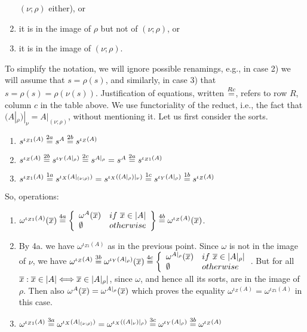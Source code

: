 \begin{PROOF}
\begin{enumerate}
$(\nu;\rho)$ either), or
\item it is in the image of $\rho$ but not of $(\nu;\rho)$, or 
\item it is in the image of $(\nu;\rho)$. 
\end{enumerate}
 To simplify the notation, we will ignore
possible renamings, e.g., in case 2) we will assume that $s=\rho(s)$, and
similarly, in case 3) that $s=\rho(s)=\rho(\nu(s))$. Justification of
equations, written $\stackrel{Rc}{=}$, refers to row $R$, column $c$ in the table
above. We use functoriality of the reduct, i.e., the fact that
$(A|_\rho)|_\nu = A|_{(\nu;\rho)}$, without mentioning it.
Let us first consider the sorts.
\begin{enumerate}
\item $s^{\iota_{Z1}(A)} \stackrel{2a}{=} s^A \stackrel{2b}{=} s^{\iota_{Z}(A)}$
\item $s^{\iota_{Z}(A)} \stackrel{2b}{=} s^{\iota_{Y}(A|_{\rho})} \stackrel{2c}{=}
s^{A|_{\rho}} = s^A \stackrel{2a}{=} s^{\iota_{Z1}(A)}$
\item $s^{\iota_{Z1}(A)} \stackrel{1a}{=} s^{\iota_{X}(A|_{(\nu;\rho)})}
 = s^{\iota_{X}((A|_{\rho})|_{\nu})} \stackrel{1c}{=} s^{\iota_{Y}(A|_{\rho})}
 \stackrel{1b}{=} s^{\iota_{Z}(A)}$
\end{enumerate}
So, operations:
\begin{enumerate}
\item $\omega^{\iota_{Z1}(A)}(\overline{x}) \stackrel{4a}{=}
\left\{\begin{array}{ll}\omega^A(\overline{x}) & if\ \overline{x}\in|A| \\ \emptyset &
otherwise\end{array}\right\}\stackrel{4b}{=} \omega^{\iota_{Z}(A)}(\overline{x})$.
\item By 4a. we have $\omega^{\iota_{Z1}(A)}$ as in the previous point. 
Since $\omega$ is not in the image of $\nu$,
we have
$\omega^{\iota_{Z}(A)} \stackrel{3b}{=} \omega^{\iota_{Y}(A|_{\rho})}(\overline{x}) \stackrel{4c}{=}
\left\{\begin{array}{ll}\omega^{A|_{\rho}}(\overline{x}) & if\ \overline{x}\in|A|_\rho| \\ \emptyset &
otherwise\end{array}\right.$. But for all $\overline{x}:\overline{x}\in |A|\Longleftrightarrow \overline{x}\in|A|_\rho|$, since $\omega$, and hence all its sorts, are in the image of
$\rho$. Then also $\omega^A(\overline{x}) = \omega^{A|_{\rho}}(\overline{x})$ which
proves the equality $\omega^{\iota_{Z}(A)}=\omega^{\iota_{Z1}(A)}$ in this case.
%
\item $\omega^{\iota_{Z1}(A)} \stackrel{3a}{=} \omega^{\iota_{X}(A|_{(\nu;\rho)})} 
 = \omega^{\iota_{X}((A|_{\nu})|_{\rho})}
 \stackrel{3c}{=} \omega^{\iota_{Y}(A|_{\rho})} \stackrel{3b}{=} \omega^{\iota_{Z}(A)}$
\end{enumerate}\vspace*{-4ex}
\end{PROOF}\vspace*{-3ex}
%
